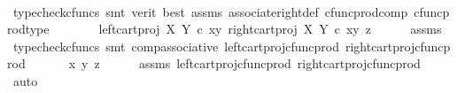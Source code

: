 \begin{isabellebody}
\ \ \ \ \isamarkupfalse%
\ {\isacharparenleft}{\kern0pt}typecheck{\isacharunderscore}{\kern0pt}cfuncs{\isacharcomma}{\kern0pt}\ smt\ {\isacharparenleft}{\kern0pt}verit{\isacharcomma}{\kern0pt}\ best{\isacharparenright}{\kern0pt}\ assms\ associate{\isacharunderscore}{\kern0pt}right{\isacharunderscore}{\kern0pt}def\ cfunc{\isacharunderscore}{\kern0pt}prod{\isacharunderscore}{\kern0pt}comp\ cfunc{\isacharunderscore}{\kern0pt}prod{\isacharunderscore}{\kern0pt}type{\isacharparenright}{\kern0pt}\isanewline
\ \ \isamarkupfalse%
\ \isamarkupfalse%
\ {\isachardoublequoteopen}{\isachardot}{\kern0pt}{\isachardot}{\kern0pt}{\isachardot}{\kern0pt}\ {\isacharequal}{\kern0pt}\ {\isasymlangle}left{\isacharunderscore}{\kern0pt}cart{\isacharunderscore}{\kern0pt}proj\ X\ Y\ {\isasymcirc}\isactrlsub c\ {\isasymlangle}x{\isacharcomma}{\kern0pt}y{\isasymrangle}{\isacharcomma}{\kern0pt}\ {\isasymlangle}right{\isacharunderscore}{\kern0pt}cart{\isacharunderscore}{\kern0pt}proj\ X\ Y\ {\isasymcirc}\isactrlsub c\ {\isasymlangle}x{\isacharcomma}{\kern0pt}y{\isasymrangle}{\isacharcomma}{\kern0pt}\ z{\isasymrangle}{\isasymrangle}{\isachardoublequoteclose}\isanewline
\ \ \ \ \isamarkupfalse%
\ assms\ \isamarkupfalse%
\ {\isacharparenleft}{\kern0pt}typecheck{\isacharunderscore}{\kern0pt}cfuncs{\isacharcomma}{\kern0pt}\ smt\ comp{\isacharunderscore}{\kern0pt}associative{}\ left{\isacharunderscore}{\kern0pt}cart{\isacharunderscore}{\kern0pt}proj{\isacharunderscore}{\kern0pt}cfunc{\isacharunderscore}{\kern0pt}prod\ right{\isacharunderscore}{\kern0pt}cart{\isacharunderscore}{\kern0pt}proj{\isacharunderscore}{\kern0pt}cfunc{\isacharunderscore}{\kern0pt}prod{\isacharparenright}{\kern0pt}\isanewline
\ \ \isamarkupfalse%
\ \isamarkupfalse%
\ {\isachardoublequoteopen}{\isachardot}{\kern0pt}{\isachardot}{\kern0pt}{\isachardot}{\kern0pt}\ {\isacharequal}{\kern0pt}{\isasymlangle}x{\isacharcomma}{\kern0pt}\ {\isasymlangle}y{\isacharcomma}{\kern0pt}\ z{\isasymrangle}{\isasymrangle}{\isachardoublequoteclose}\isanewline
\ \ \ \ \isamarkupfalse%
\ assms\ left{\isacharunderscore}{\kern0pt}cart{\isacharunderscore}{\kern0pt}proj{\isacharunderscore}{\kern0pt}cfunc{\isacharunderscore}{\kern0pt}prod\ right{\isacharunderscore}{\kern0pt}cart{\isacharunderscore}{\kern0pt}proj{\isacharunderscore}{\kern0pt}cfunc{\isacharunderscore}{\kern0pt}prod\ \isamarkupfalse%
\ auto\isanewline
\ \ \isamarkupfalse%
\ \isamarkupfalse%

\end{isabellebody}
